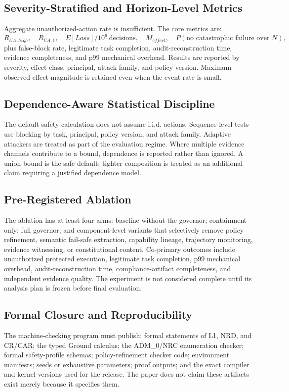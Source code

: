 \documentclass[11pt]{article}
\def\ensuremath#1{#1}%
\def\mathrm#1{#1}%
\def\mathsf#1{#1}%
\newcommand{\ADM}{\texorpdfstring{\ensuremath{\mathrm{ADM}_0}}{ADM0}}
\newcommand{\Ground}{\ensuremath{\mathsf{Ground}}}
\begin{document}
\subsection{Severity-Stratified and Horizon-Level Metrics}
Aggregate unauthorized-action rate is insufficient. The core metrics are:
\[
R_{UA,high},\quad R_{UA,1},\quad E[Loss]/10^6\ \text{decisions},\quad M_{effect},\quad P(\text{no catastrophic failure over }N),
\]
plus false-block rate, legitimate task completion, audit-reconstruction time, evidence completeness, and p99 mechanical overhead. Results are reported by severity, effect class, principal, attack family, and policy version. Maximum observed effect magnitude is retained even when the event rate is small.

\subsection{Dependence-Aware Statistical Discipline}
The default safety calculation does not assume i.i.d. actions. Sequence-level tests use blocking by task, principal, policy version, and attack family. Adaptive attackers are treated as part of the evaluation regime. Where multiple evidence channels contribute to a bound, dependence is reported rather than ignored. A union bound is the safe default; tighter composition is treated as an additional claim requiring a justified dependence model.

\subsection{Pre-Registered Ablation}
The ablation has at least four arms: baseline without the governor; containment-only; full governor; and component-level variants that selectively remove policy refinement, semantic fail-safe extraction, capability lineage, trajectory monitoring, evidence witnessing, or constitutional content. Co-primary outcomes include unauthorized protected execution, legitimate task completion, p99 mechanical overhead, audit-reconstruction time, compliance-artifact completeness, and independent evidence quality. The experiment is not considered complete until its analysis plan is frozen before final evaluation.

\subsection{Formal Closure and Reproducibility}
The machine-checking program must publish: formal statements of L1, NRD, and CR/CAR; the typed \Ground{} calculus; the \ADM{}/NRC enumeration checker; formal safety-profile schemas; policy-refinement checker code; environment manifests; seeds or exhaustive parameters; proof outputs; and the exact compiler and kernel versions used for the release. The paper does not claim these artifacts exist merely because it specifies them.
\end{document}
